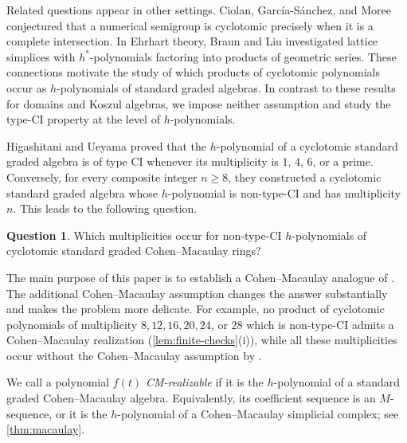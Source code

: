 \documentclass[11pt,a4paper]{amsart}
\theoremstyle{definition}
\newtheorem{question}[question]{Question}
\theoremstyle{remark}
\begin{document}
Related questions appear in other settings. Ciolan, Garc\'ia-S\'anchez, and Moree \cite{CiolanGarciaMoree} conjectured that a numerical semigroup is cyclotomic precisely when it is a complete intersection. In Ehrhart theory, Braun and Liu \cite{BraunLiu} investigated lattice simplices with $h^*$-polynomials factoring into products of geometric series. These connections motivate the study of which products of cyclotomic polynomials occur as $h$-polynomials of standard graded algebras. In contrast to these results for domains and Koszul algebras, we impose neither assumption and study the type-CI property at the level of $h$-polynomials.

Higashitani and Ueyama \cite[Theorem~1.3]{HigashitaniUeyama} proved that the $h$-polynomial of a cyclotomic standard graded algebra is of type CI whenever its multiplicity is $1$, $4$, $6$, or a prime. Conversely, for every composite integer $n\ge8$, they constructed a cyclotomic standard graded algebra whose $h$-polynomial is non-type-CI and has multiplicity $n$. This leads to the following question.
\begin{question}
Which multiplicities occur for non-type-CI $h$-polynomials of cyclotomic standard graded Cohen--Macaulay rings?
\end{question}

The main purpose of this paper is to establish a Cohen--Macaulay analogue of \cite[Theorem~1.3]{HigashitaniUeyama}. The additional Cohen--Macaulay assumption changes the answer substantially and makes the problem more delicate. For example, no product of cyclotomic polynomials of multiplicity $8,12,16,20,24$, or $28$ which is non-type-CI admits a Cohen--Macaulay realization (\cref{lem:finite-checks}\textup{(i)}), while all these multiplicities occur without the Cohen--Macaulay assumption by \cite[Theorem~1.3(2)]{HigashitaniUeyama}.

We call a polynomial $f(t)$ \emph{CM-realizable} if it is the $h$-polynomial of a standard graded Cohen--Macaulay algebra. Equivalently, its coefficient sequence is an $M$-sequence, or it is the $h$-polynomial of a Cohen--Macaulay simplicial complex; see \cref{thm:macaulay}.
\end{document}
